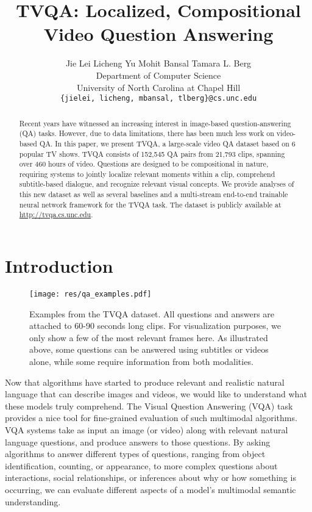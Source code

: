 \documentclass[11pt,a4paper]{article}
\title{TVQA: Localized, Compositional Video Question Answering}
\author{
  Jie Lei  Licheng Yu  
  Mohit Bansal  Tamara L. Berg \\
  Department of Computer Science \\ University of North Carolina at Chapel Hill \\
  {\tt \{jielei, licheng, mbansal, tlberg\}@cs.unc.edu} \\
  }
\date{}
\begin{document}
\maketitle
\begin{abstract}
Recent years have witnessed an increasing interest in image-based question-answering (QA) tasks.
However, due to data limitations, there has been much less work on video-based QA.
In this paper, we present TVQA, a large-scale video QA dataset based on 6 popular TV shows. TVQA consists of 152,545 QA pairs from 21,793 clips, spanning over 460 hours of video.
Questions are designed to be compositional in nature, requiring systems to jointly localize relevant moments within a clip, comprehend subtitle-based dialogue, and recognize relevant visual concepts.
We provide analyses of this new dataset as well as several baselines and a multi-stream end-to-end trainable neural network framework for the TVQA task. The dataset is publicly available at \url{http://tvqa.cs.unc.edu}.
\end{abstract}

\section{Introduction}

\begin{figure*}[ht!]
  \texttt{[image: res/qa\_examples.pdf]}
  \vspace{-10pt}
  \caption{Examples from the TVQA dataset. All questions and answers are attached to 60-90 seconds long clips. For visualization purposes, we only show a few of the most relevant frames here. As illustrated above, some questions can be answered using subtitles or videos alone, while some require information from both modalities.}
  \label{fig:qa_examples_main}
  \vspace{-10pt}
\end{figure*}

Now that algorithms have started to produce relevant and realistic natural language that can describe images and videos, we would like to understand what these models truly comprehend. The Visual Question Answering (VQA) task provides a nice tool for fine-grained evaluation of such multimodal algorithms. VQA systems take as input an image (or video) along with relevant natural language questions, and produce answers to those questions. By asking algorithms to answer different types of questions, ranging from object identification, counting, or appearance, to more complex questions about interactions, social relationships, or inferences about why or how something is occurring, we can evaluate different aspects of a model's multimodal semantic understanding. 
\end{document}
